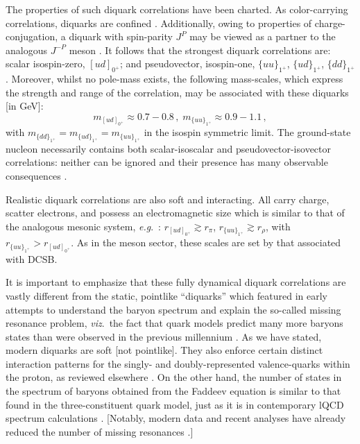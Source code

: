 The properties of such diquark correlations have been charted.  As color-carrying correlations, diquarks are confined \cite{Bender:1996bb, Bender:2002as, Bhagwat:2004hn}.  Additionally, owing to properties of charge-conjugation, a diquark with spin-parity $J^P$ may be viewed as a partner to the analogous $J^{-P}$ meson \cite{Cahill:1987qr}.  It follows that the strongest diquark correlations are: scalar isospin-zero, $[ud]_{0^+}$; and pseudovector, isospin-one, $\{uu\}_{1^+}$, $\{ud\}_{1^+}$, $\{dd\}_{1^+}$.  Moreover, whilst no pole-mass exists, the following mass-scales, which express the strength and range of the correlation, may be associated with these diquarks \cite{Cahill:1987qr, Maris:2002yu, Alexandrou:2006cq, Babich:2007ah, Eichmann:2016hgl, Lu:2017cln} [in GeV]:
\begin{equation}
m_{[ud]_{0^+}} \approx 0.7-0.8\,,\;
m_{\{uu\}_{1^+}}  \approx 0.9-1.1  \,,
\end{equation}
with $m_{\{dd\}_{1^+}}=m_{\{ud\}_{1^+}} = m_{\{uu\}_{1^+}}$ in the isospin symmetric limit.  The ground-state nucleon necessarily contains both scalar-isoscalar and pseudovector-isovector correlations: neither can be ignored and their presence has many observable consequences \cite{Roberts:2013mja, Segovia:2013uga}.

Realistic diquark correlations are also soft and interacting.  All carry charge, scatter electrons, and possess an electromagnetic size which is similar to that of the analogous mesonic system, \emph{e.g}.\ \cite{Maris:2004bp, Eichmann:2008ef, Roberts:2011wy}:
$r_{[ud]_{0^+}} \gtrsim r_\pi$, $r_{\{uu\}_{1^+}} \gtrsim r_\rho$,
with $r_{\{uu\}_{1^+}} > r_{[ud]_{0^+}}$.  As in the meson sector, these scales are set by that associated with DCSB.

It is important to emphasize that these fully dynamical diquark correlations are vastly different from the static, pointlike ``diquarks'' which featured in early attempts \cite{Lichtenberg:1967zz, Lichtenberg:1968zz} to understand the baryon spectrum and explain the so-called missing resonance problem, \emph{viz}.\ the fact that quark models predict many more baryons states than were observed in the previous millennium \cite{Burkert:2004sk}.   As we have stated, modern diquarks are soft [not pointlike].  They also enforce certain distinct interaction patterns for the singly- and doubly-represented valence-quarks within the proton, as reviewed elsewhere \cite{Roberts:2013mja, Segovia:2014aza, Roberts:2015lja, Segovia:2016zyc}.  On the other hand, the number of states in the spectrum of baryons obtained from the Faddeev equation \cite{Eichmann:2016hgl, Lu:2017cln} is similar to that found in the three-constituent quark model, just as it is in contemporary lQCD spectrum calculations \cite{Edwards:2011jj}.  [Notably, modern data and recent analyses have already reduced the number of missing resonances \cite{Ripani:2002ss, Burkert:2012ee, Kamano:2013iva, Crede:2013sze, Mokeev:2015moa,  Anisovich:2017pmi}.]

